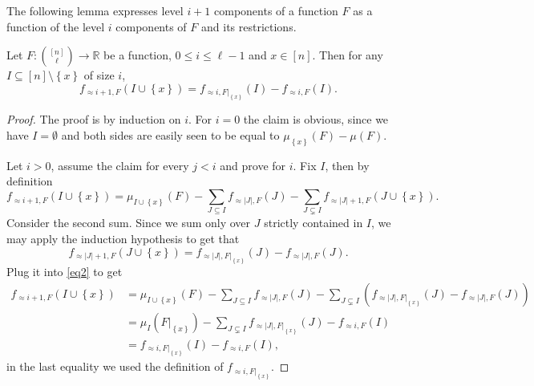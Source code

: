 \documentclass{toc}
\newcommand\card[1]{\left| {#1} \right|}
\newcommand\set[1]{{\left\{ #1 \right\}}}
\renewcommand\leq{\leqslant}
\newcommand\approxlvlfn[2]{{#1}_{\approx{#2}}}
\begin{document}
The following lemma expresses level $i+1$ components of a function $F$ as a function of the level $i$ components of
$F$ and its restrictions.
\begin{lemma}\label{lemma:restrict}
Let $F\colon {[n]\choose \ell}\to\mathbb{R}$ be a function, $0\leq i\leq \ell-1$
and $x\in [n]$.
Then for any $I\subseteq [n]\setminus\set{x}$ of size $i$,
\[
\approxlvlfn{f}{i+1, F}(I\cup\set{x})
= \approxlvlfn{f}{i,F|_{\set{x}}}(I) - \approxlvlfn{f}{i,F}(I).
\]
\end{lemma}
\begin{proof}
The proof is by induction on $i$. For $i=0$ the claim is obvious, since we have $I=\emptyset$ and
both sides are easily seen to be equal to $\mu_{\set{x}}(F)-\mu(F)$.

Let $i>0$, assume the claim for every $j<i$ and prove for $i$. Fix $I$, then by definition
\begin{equation}\label{eq2}
\approxlvlfn{f}{i+1, F}(I\cup\set{x})
=\mu_{I\cup\set{x}}(F)
-\sum\limits_{J\subseteq I}{\approxlvlfn{f}{\card{J}, F}(J)}
-\sum\limits_{J\subsetneq I}{\approxlvlfn{f}{\card{J}+1, F}(J\cup\set{x})}.
\end{equation}
Consider the second sum. Since we sum only over $J$ strictly contained in $I$, we may
apply the induction hypothesis to get that
\[
\approxlvlfn{f}{\card{J}+1, F}(J\cup\set{x})
=\approxlvlfn{f}{\card{J}, F|_{\set{x}}}(J)
-\approxlvlfn{f}{\card{J}, F}(J).
\]
Plug it into \eqref{eq2} to get
\begin{align*}
\approxlvlfn{f}{i+1, F}(I\cup\set{x})
&=\mu_{I\cup\set{x}}(F)
-\sum\limits_{J\subseteq I}{\approxlvlfn{f}{\card{J}, F}(J)}
-\sum\limits_{J\subsetneq I}
{(\approxlvlfn{f}{\card{J}, F|_{\set{x}}}(J) - \approxlvlfn{f}{\card{J}, F}(J))}\\
&= \mu_{I}(F|_{\set{x}}) -
\sum\limits_{J\subsetneq I}{\approxlvlfn{f}{\card{J}, F|_{\set{x}}}(J)}
-\approxlvlfn{f}{i, F}(I)\\
&=\approxlvlfn{f}{i, F|_{\set{x}}}(I)-\approxlvlfn{f}{i, F}(I),
\end{align*}
in the last equality we used the definition of $\approxlvlfn{f}{i, F|_{\set{x}}}$.
\end{proof}
\end{document}
